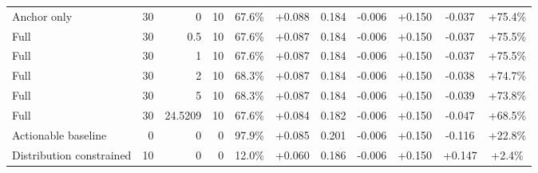 \begin{table}[htbp]
\begin{tabular}{lrrrccccccc}
Anchor only & 30 & 0 & 10 & 67.6\% & +0.088 & 0.184 & -0.006 & +0.150 & -0.037 & +75.4\% \\
Full & 30 & 0.5 & 10 & 67.6\% & +0.087 & 0.184 & -0.006 & +0.150 & -0.037 & +75.5\% \\
Full & 30 & 1 & 10 & 67.6\% & +0.087 & 0.184 & -0.006 & +0.150 & -0.037 & +75.5\% \\
Full & 30 & 2 & 10 & 68.3\% & +0.087 & 0.184 & -0.006 & +0.150 & -0.038 & +74.7\% \\
Full & 30 & 5 & 10 & 68.3\% & +0.087 & 0.184 & -0.006 & +0.150 & -0.039 & +73.8\% \\
Full & 30 & 24.5209 & 10 & 67.6\% & +0.084 & 0.182 & -0.006 & +0.150 & -0.047 & +68.5\% \\
Actionable baseline & 0 & 0 & 0 & 97.9\% & +0.085 & 0.201 & -0.006 & +0.150 & -0.116 & +22.8\% \\
Distribution constrained & 10 & 0 & 0 & 12.0\% & +0.060 & 0.186 & -0.006 & +0.150 & +0.147 & +2.4\% \\
\bottomrule
\end{tabular}
\end{table}